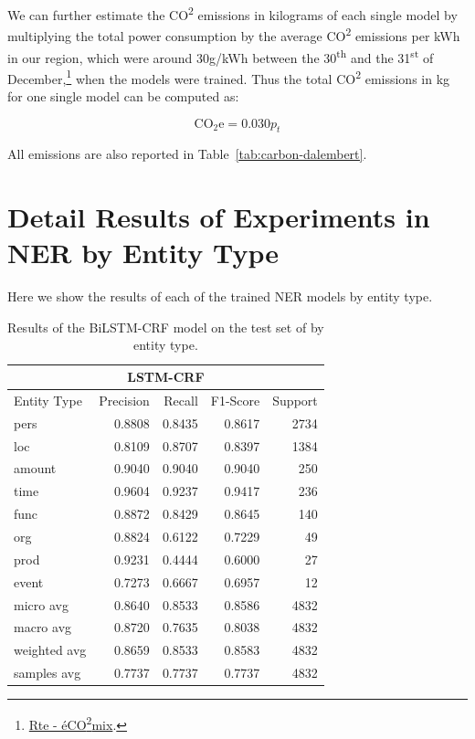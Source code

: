 We can further estimate the CO\textsuperscript{2} emissions in kilograms of each single model by multiplying the total power consumption by the average CO\textsuperscript{2} emissions per kWh in our region, which were around 30g/kWh between the 30\textsuperscript{th} and the 31\textsuperscript{st} of December,\footnote{\href{https://www.rte-france.com/eco2mix/les-emissions-de-co2-par-kwh-produit-en-france}{Rte - éCO\textsuperscript{2}mix}.} when the models were trained. Thus the total CO\textsuperscript{2} emissions in kg for one single model can be computed as:

\begin{equation*}
    \text{CO}_{2}\text{e} = 0.030 p_t
\end{equation*}

All emissions are also reported in Table~\ref{tab:carbon-dalembert}.

\section{Detail Results of Experiments in NER by Entity Type}

Here we show the results of each of the trained NER models by entity type.

\begin{table}[ht!]
    \centering\small
    \begin{tabular}{lrrrr}
        \toprule
        \multicolumn{5}{c}{\textsc{LSTM-CRF}}                  \\
        \midrule
        Entity Type  & Precision & Recall & F1-Score & Support \\
        \midrule
        pers         & 0.8808    & 0.8435 & 0.8617   & 2734    \\
        loc          & 0.8109    & 0.8707 & 0.8397   & 1384    \\
        amount       & 0.9040    & 0.9040 & 0.9040   & 250     \\
        time         & 0.9604    & 0.9237 & 0.9417   & 236     \\
        func         & 0.8872    & 0.8429 & 0.8645   & 140     \\
        org          & 0.8824    & 0.6122 & 0.7229   & 49      \\
        prod         & 0.9231    & 0.4444 & 0.6000   & 27      \\
        event        & 0.7273    & 0.6667 & 0.6957   & 12      \\
        \midrule
        micro avg    & 0.8640    & 0.8533 & 0.8586   & 4832    \\
        macro avg    & 0.8720    & 0.7635 & 0.8038   & 4832    \\
        weighted avg & 0.8659    & 0.8533 & 0.8583   & 4832    \\
        samples avg  & 0.7737    & 0.7737 & 0.7737   & 4832    \\
        \bottomrule
    \end{tabular}
    \caption{Results of the BiLSTM-CRF model on the test set of \freemner by entity type.}
\end{table}


